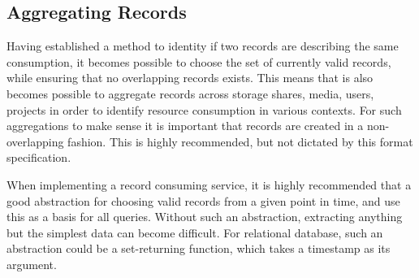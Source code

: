 \subsection{Aggregating Records}

Having established a method to identity if two records are describing the same
consumption, it becomes possible to choose the set of currently valid records,
while ensuring that no overlapping records exists. This means that is also
becomes possible to aggregate records across storage shares, media, users,
projects in order to identify resource consumption in various contexts. For
such aggregations to make sense it is important that records are created in
a non-overlapping fashion. This is highly recommended, but not dictated by
this format specification.

When implementing a record consuming service, it is highly recommended that a
good abstraction for choosing valid records from a given point in time, and use
this as a basis for all queries. Without such an abstraction, extracting
anything but the simplest data can become difficult. For relational database,
such an abstraction could be a set-returning function, which takes a timestamp
as its argument.

